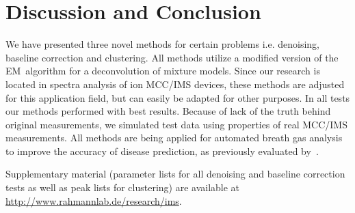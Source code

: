 \documentclass{article}
\begin{document}
\section{Discussion and Conclusion}
\label{sec:discussion}

We have presented three novel methods for certain problems i.e. denoising, baseline correction and clustering.
All methods utilize a modified version of the EM~algorithm for a deconvolution of mixture models.
Since our research is located in spectra analysis of ion MCC/IMS devices, these methods are adjusted for this application field, but can easily be adapted for other purposes.
In all tests our methods performed with best results.
Because of lack of the truth behind original measurements, we simulated test data using properties of real MCC/IMS measurements.
All methods are being applied for automated breath gas analysis to improve the accuracy of disease prediction, as previously evaluated by~\cite{hauschild2013eval}.

Supplementary material (parameter lists for all denoising and baseline correction tests as well as peak lists for clustering) are available at \url{http://www.rahmannlab.de/research/ims}.
\end{document}
